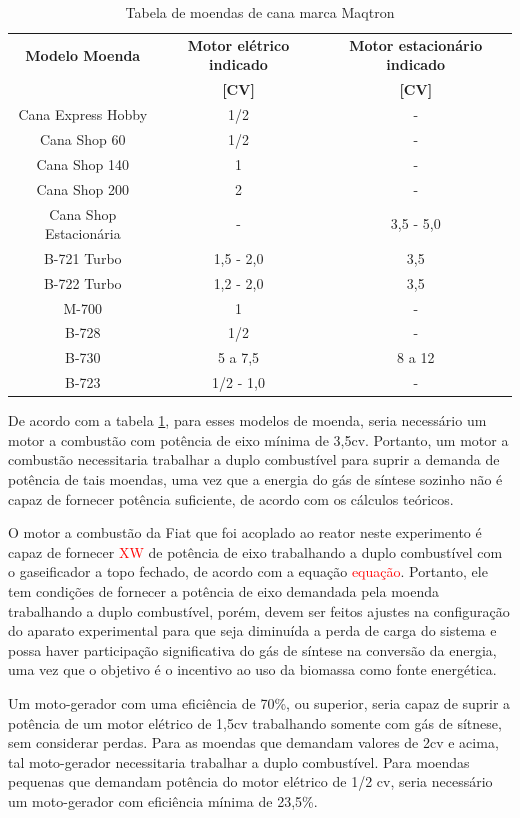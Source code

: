 \begin{table}[h]
	\centering
	\caption{Tabela de moendas de cana marca Maqtron \cite{catalogo2016}}
	\begin{tabular}{|c|c|c|}
	\hline
	\rowcolor{lightgray}\textbf{Modelo Moenda} & \textbf{Motor elétrico indicado} & \textbf{Motor estacionário indicado} \\
	\rowcolor{lightgray} & \textbf{[CV]} & \textbf{[CV]} \\
	\hline
	Cana Express Hobby & 1/2 & - \\
	Cana Shop 60 & 1/2 & - \\
	Cana Shop 140 & 1 & - \\
	Cana Shop 200 & 2 & - \\
	Cana Shop Estacionária & - & 3,5 - 5,0 \\
	B-721 Turbo & 1,5 - 2,0 & 3,5 \\
	B-722 Turbo & 1,2 - 2,0 & 3,5 \\
	M-700 & 1 & - \\
	B-728 & 1/2 & - \\
	B-730 & 5 a 7,5 & 8 a 12 \\
	B-723 & 1/2 - 1,0 & - \\
	\hline
	\end{tabular}
	\label{tabela_moendas}
\end{table}	

De acordo com a tabela \ref{tabela_moendas}, para esses modelos de moenda, seria necessário um motor a combustão com potência de eixo mínima de 3,5cv. Portanto, um motor a combustão necessitaria trabalhar a duplo combustível para suprir a demanda de potência de tais moendas, uma vez que a energia do gás de síntese sozinho não é capaz de fornecer potência suficiente, de acordo com os cálculos teóricos.

O motor a combustão da Fiat que foi acoplado ao reator neste experimento é capaz de fornecer \textcolor{red}{XW} de potência de eixo trabalhando a duplo combustível com o gaseificador a topo fechado, de acordo com a equação \textcolor{red}{equação}. Portanto, ele tem condições de fornecer a potência de eixo demandada pela moenda trabalhando a duplo combustível, porém, devem ser feitos ajustes na configuração do aparato experimental para que seja diminuída a perda de carga do sistema e possa haver participação significativa do gás de síntese na conversão da energia, uma vez que o objetivo é o incentivo ao uso da biomassa como fonte energética.

Um moto-gerador com uma eficiência de 70\%, ou superior, seria capaz de suprir a potência de um motor elétrico de 1,5cv trabalhando somente com gás de sítnese, sem considerar perdas. Para as moendas que demandam valores de 2cv e acima, tal moto-gerador necessitaria trabalhar a duplo combustível. Para moendas pequenas que demandam potência do motor elétrico de 1/2 cv, seria necessário um moto-gerador com eficiência mínima de 23,5\%.

		